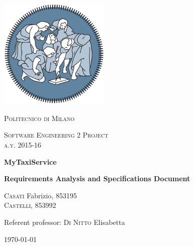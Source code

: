 



%
%    

\begin{titlepage}
	\centering
	\includegraphics[width=150pt]{polimi_logo}\par\vspace{1cm}
	{\scshape\LARGE
		Politecnico di Milano\par}
	\vspace{1cm}
	{\scshape\Large
		Software Engineering 2 Project\\
		a.y. 2015-16\par}
	\vspace{1.5cm}
	{\huge\bfseries
		MyTaxiService\\\par}
	{\Large\bfseries
		Requirements Analysis and Specifications Document\par}
	\vspace{2cm}
	{\Large
		{\scshape Casati} Fabrizio, 853195\\
		{\scshape Castelli}, 853992\par}
	\vfill
	Referent professor: {\scshape Di Nitto} Elisabetta\par

	\vfill

	{\large \today\par}
\end{titlepage}

